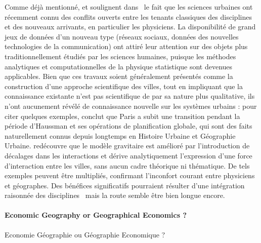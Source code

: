 {Comme déjà mentionné,  et  soulignent dans~\cite{dupuy2015sciences} le fait que les sciences urbaines ont récemment connu des conflits ouverts entre les tenants classiques des disciplines et des nouveaux arrivants, en particulier les physiciens. La disponibilité de grand jeux de données d'un nouveau type (réseaux sociaux, données des nouvelles technologies de la communication) ont attiré leur attention sur des objets plus traditionnellement étudiés par les sciences humaines, puisque les méthodes analytiques et computationnelles de la physique statistique sont devenues applicables. Bien que ces travaux soient généralement présentés comme la construction d'une approche scientifique des villes, tout en impliquant que la connaissance existante n'est pas scientifique de par sa nature plus qualitative, ils n'ont aucunement révélé de connaissance nouvelle sur les systèmes urbains : pour citer quelques exemples, \cite{barthelemy2013self} conclut que Paris a subit une transition pendant la période d'Haussman et ses opérations de planification globale, qui sont des faits naturellement connus depuis longtemps en Histoire Urbaine et Géographie Urbaine. \cite{chen2009urban} redécouvre que le modèle gravitaire est amélioré par l'introduction de décalages dans les interactions et dérive analytiquement l'expression d'une force d'interaction entre les villes, sans aucun cadre théorique ni thématique. De tels exemples peuvent être multipliés, confirmant l'inconfort courant entre physiciens et géographes. Des bénéfices significatifs pourraient résulter d'une intégration raisonnée des disciplines~\cite{o2015physicists} mais la route semble être bien longue encore.
}


\paragraph{Economic Geography or Geographical Economics ?}{Economie Géographie ou Géographie Economique ?}





